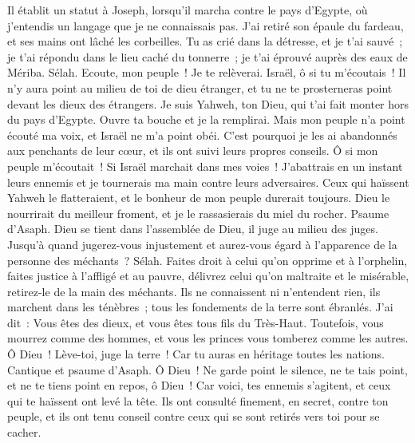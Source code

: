 \begin{multicols}{2}
Il établit un statut à Joseph, lorsqu'il marcha contre le pays d'Egypte, où j'entendis un langage que je ne connaissais pas.
J'ai retiré son épaule du fardeau, et ses mains ont lâché les corbeilles.
Tu as crié dans la détresse, et je t'ai sauvé~; je t'ai répondu dans le lieu caché du tonnerre~; je t'ai éprouvé auprès des eaux de Mériba. Sélah.
Ecoute, mon peuple~! Je te relèverai. Israël, ô si tu m'écoutais~!
 Il n'y aura point au milieu de toi de dieu étranger, et tu ne te prosterneras point devant les dieux des étrangers.
Je suis Yahweh, ton Dieu, qui t'ai fait monter hors du pays d'Egypte. Ouvre ta bouche et je la remplirai.
Mais mon peuple n'a point écouté ma voix, et Israël ne m'a point obéi.
C'est pourquoi je les ai abandonnés aux penchants de leur cœur, et ils ont suivi leurs propres conseils.
Ô si mon peuple m'écoutait~! Si Israël marchait dans mes voies~!
J'abattrais en un instant leurs ennemis et je tournerais ma main contre leurs adversaires.
Ceux qui haïssent Yahweh le flatteraient, et le bonheur de mon peuple durerait toujours.
Dieu le nourrirait du meilleur froment, et je le rassasierais du miel du rocher.
\VerseOne{}Psaume d'Asaph. Dieu se tient dans l'assemblée de Dieu, il juge au milieu des juges.
Jusqu'à quand jugerez-vous injustement et aurez-vous égard à l'apparence de la personne des méchants~? Sélah.
Faites droit à celui qu'on opprime et à l'orphelin, faites justice à l'affligé et au pauvre,
délivrez celui qu'on maltraite et le misérable, retirez-le de la main des méchants.
Ils ne connaissent ni n'entendent rien, ils marchent dans les ténèbres~; tous les fondements de la terre sont ébranlés.
J'ai dit~: Vous êtes des dieux, et vous êtes tous fils du Très-Haut.
Toutefois, vous mourrez comme des hommes, et vous les princes vous tomberez comme les autres.
Ô Dieu~! Lève-toi, juge la terre~! Car tu auras en héritage toutes les nations.
\VerseOne{}Cantique et psaume d'Asaph.
Ô Dieu~! Ne garde point le silence, ne te tais point, et ne te tiens point en repos, ô Dieu~!
Car voici, tes ennemis s'agitent, et ceux qui te haïssent ont levé la tête.
Ils ont consulté finement, en secret, contre ton peuple, et ils ont tenu conseil contre ceux qui se sont retirés vers toi pour se cacher.

\end{multicols}

